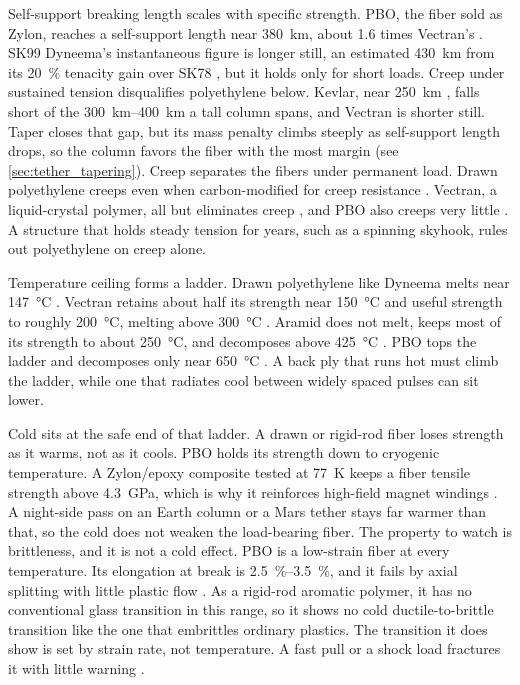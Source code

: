 \documentclass{article}
\begin{document}
Self-support breaking length scales with specific strength. PBO, the fiber sold as Zylon, reaches a self-support length near \SI{380}{\kilo\meter}, about \num{1.6} times Vectran's \cite{zylon_technical_info}. SK99 Dyneema's instantaneous figure is longer still, an estimated \SI{430}{\kilo\meter} from its \SI{20}{\percent} tenacity gain over SK78 \cite{dyneema_sk99_datasheet}, but it holds only for short loads.  Creep under sustained tension disqualifies polyethylene below. Kevlar, near \SI{250}{\kilo\meter} \cite{cambridge_materials_databook}, falls short of the \SIrange{300}{400}{\kilo\meter} a tall column spans, and Vectran is shorter still. Taper closes that gap, but its mass penalty climbs steeply as self-support length drops, so the column favors the fiber with the most margin (see \autoref{sec:tether_tapering}). Creep separates the fibers under permanent load. Drawn polyethylene creeps even when carbon-modified for creep resistance \cite{sk99_tension}. Vectran, a liquid-crystal polymer, all but eliminates creep \cite{vectran_brochure}, and PBO also creeps very little \cite{zylon_technical_info}. A structure that holds steady tension for years, such as a spinning skyhook, rules out polyethylene on creep alone.

Temperature ceiling forms a ladder. Drawn polyethylene like Dyneema melts near \SI{147}{\celsius} \cite{uhmwpe_fiber_datasheet}. Vectran retains about half its strength near \SI{150}{\celsius} and useful strength to roughly \SI{200}{\celsius}, melting above \SI{300}{\celsius} \cite{vectran_brochure}. Aramid does not melt, keeps most of its strength to about \SI{250}{\celsius}, and decomposes above \SI{425}{\celsius} \cite{kevlar_technical_guide}. PBO tops the ladder and decomposes only near \SI{650}{\celsius} \cite{zylon_technical_info}. A back ply that runs hot must climb the ladder, while one that radiates cool between widely spaced pulses can sit lower.

Cold sits at the safe end of that ladder. A drawn or rigid-rod fiber loses strength as it warms, not as it cools. PBO holds its strength down to cryogenic temperature. A Zylon/epoxy composite tested at \SI{77}{\kelvin} keeps a fiber tensile strength above \SI{4.3}{\giga\pascal}, which is why it reinforces high-field magnet windings \cite{zylon_cryogenic}. A night-side pass on an Earth column or a Mars tether stays far warmer than that, so the cold does not weaken the load-bearing fiber. The property to watch is brittleness, and it is not a cold effect. PBO is a low-strain fiber at every temperature. Its elongation at break is \SIrange{2.5}{3.5}{\percent}, and it fails by axial splitting with little plastic flow \cite{zylon_technical_info}. As a rigid-rod aromatic polymer, it has no conventional glass transition in this range, so it shows no cold ductile-to-brittle transition like the one that embrittles ordinary plastics. The transition it does show is set by strain rate, not temperature. A fast pull or a shock load fractures it with little warning \cite{pbo_strain_rate_dbt}.
\end{document}
